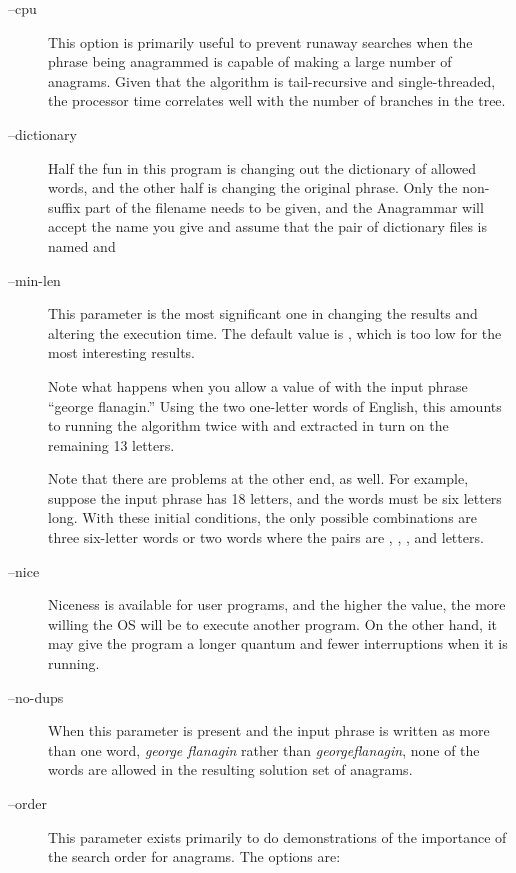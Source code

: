 \documentclass[letterpaper, 11pt]{article}
\begin{document}
\begin{description}
\item[--cpu] This option is primarily useful to prevent runaway searches
when the phrase being anagrammed is capable of making a large number of 
anagrams. Given that the algorithm is tail-recursive and single-threaded,
the processor time correlates well with the number of branches in the
tree.

\item[--dictionary] Half the fun in this program is changing out
the dictionary of allowed words, and the other half is changing the
original phrase. Only the non-suffix part of the filename needs to
be given, and the Anagrammar will accept the name you give and assume
that the pair of dictionary files is named  and 
 
\item[--min-len] This parameter is the most significant one in
changing the results and altering the execution time. The default
value is , which is too low for the most interesting results. 

Note what happens when you allow a value of  with the input
phrase ``george flanagin.'' Using the two one-letter words of English,
this amounts to running the algorithm twice with  and  
extracted in turn on the remaining 13 letters. 

Note that there are problems at the other end, as well. For example,
suppose the input phrase has 18 letters, and the words must be six letters
long. With these initial conditions, the only possible combinations are three six-letter words
or two words where the pairs are , , , and  letters.

\item[--nice] Niceness is available for user programs, and the
higher the value, the more willing the OS will be to execute another
program. On the other hand, it may give the program a longer quantum and
fewer interruptions when it is running. 

\item[--no-dups] When this parameter is present and the input
phrase is written as more than one word, \ie \emph{george flanagin} 
rather than \emph{georgeflanagin}, none of the words are allowed 
in the resulting solution set of anagrams.

\item[--order] This parameter exists primarily to do demonstrations
of the importance of the search order for anagrams. The options are:


\end{description}
\end{document}
